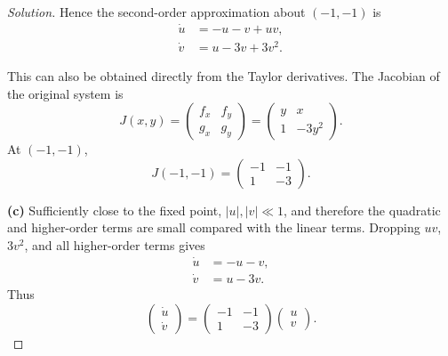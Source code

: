 \documentclass[12pt]{amsart}
\theoremstyle{conjecture}
\theoremstyle{definition}
\theoremstyle{question}
\theoremstyle{theorem}
\newenvironment{solution}
{\begin{proof}[Solution]}
{\end{proof}}
\begin{document}
\begin{solution}
        Hence the second-order approximation about $(-1,-1)$ is
        \[
            \boxed{
                \begin{aligned}
                    \dot{u}&=-u-v+uv,\\
                    \dot{v}&=u-3v+3v^2.
                \end{aligned}}
        \]

        This can also be obtained directly from the Taylor derivatives.  The
        Jacobian of the original system is
        \[
            J(x,y)
            =
            \begin{pmatrix}
                f_x & f_y\\
                g_x & g_y
            \end{pmatrix}
            =
            \begin{pmatrix}
                y & x\\
                1 & -3y^2
            \end{pmatrix}.
        \]
        At $(-1,-1)$,
        \[
            J(-1,-1)
            =
            \begin{pmatrix}
                -1 & -1\\
                1 & -3
            \end{pmatrix}.
        \]

        \bigskip

        \textbf{(c)} Sufficiently close to the fixed point, $|u|,|v|\ll 1$,
        and therefore the quadratic and higher-order terms are small compared
        with the linear terms.  Dropping $uv$, $3v^2$, and all higher-order
        terms gives
        \[
            \begin{aligned}
                \dot{u}&=-u-v,\\
                \dot{v}&=u-3v.
            \end{aligned}
        \]
        Thus
        \[
            \boxed{
                \begin{pmatrix}
                    \dot{u}\\
                    \dot{v}
                \end{pmatrix}
                =
                \begin{pmatrix}
                    -1 & -1\\
                    1 & -3
                \end{pmatrix}
                \begin{pmatrix}
                    u\\
                    v
                \end{pmatrix}.}
        \]


\end{solution}
\end{document}
